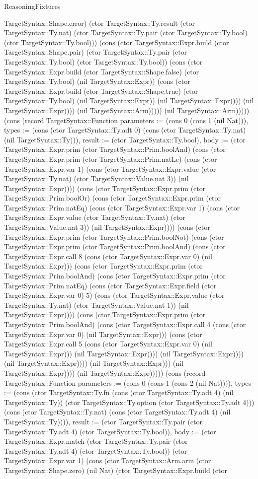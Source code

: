 \begin{lexlean}{ReasoningFixtures}
\begin{semanticmodule}
{TargetSyntax::Shape.error) (ctor TargetSyntax::Ty.result (ctor TargetSyntax::Ty.nat) (ctor TargetSyntax::Ty.pair (ctor TargetSyntax::Ty.bool) (ctor TargetSyntax::Ty.bool))) (cons (ctor TargetSyntax::Expr.build (ctor TargetSyntax::Shape.pair) (ctor TargetSyntax::Ty.pair (ctor TargetSyntax::Ty.bool) (ctor TargetSyntax::Ty.bool)) (cons (ctor TargetSyntax::Expr.build (ctor TargetSyntax::Shape.false) (ctor TargetSyntax::Ty.bool) (nil TargetSyntax::Expr)) (cons (ctor TargetSyntax::Expr.build (ctor TargetSyntax::Shape.true) (ctor TargetSyntax::Ty.bool) (nil TargetSyntax::Expr)) (nil TargetSyntax::Expr)))) (nil TargetSyntax::Expr)))) (nil TargetSyntax::Arm))))) (nil TargetSyntax::Arm))))}) (cons (record TargetSyntax::Function {parameters := (cons 0 (cons 1 (nil Nat))), types := (cons (ctor TargetSyntax::Ty.adt 0) (cons (ctor TargetSyntax::Ty.nat) (nil TargetSyntax::Ty))), result := (ctor TargetSyntax::Ty.bool), body := (ctor TargetSyntax::Expr.prim (ctor TargetSyntax::Prim.boolAnd) (cons (ctor TargetSyntax::Expr.prim (ctor TargetSyntax::Prim.natLe) (cons (ctor TargetSyntax::Expr.var 1) (cons (ctor TargetSyntax::Expr.value (ctor TargetSyntax::Ty.nat) (ctor TargetSyntax::Value.nat 3)) (nil TargetSyntax::Expr)))) (cons (ctor TargetSyntax::Expr.prim (ctor TargetSyntax::Prim.boolOr) (cons (ctor TargetSyntax::Expr.prim (ctor TargetSyntax::Prim.natEq) (cons (ctor TargetSyntax::Expr.var 1) (cons (ctor TargetSyntax::Expr.value (ctor TargetSyntax::Ty.nat) (ctor TargetSyntax::Value.nat 3)) (nil TargetSyntax::Expr)))) (cons (ctor TargetSyntax::Expr.prim (ctor TargetSyntax::Prim.boolNot) (cons (ctor TargetSyntax::Expr.prim (ctor TargetSyntax::Prim.boolAnd) (cons (ctor TargetSyntax::Expr.call 8 (cons (ctor TargetSyntax::Expr.var 0) (nil TargetSyntax::Expr))) (cons (ctor TargetSyntax::Expr.prim (ctor TargetSyntax::Prim.boolAnd) (cons (ctor TargetSyntax::Expr.prim (ctor TargetSyntax::Prim.natEq) (cons (ctor TargetSyntax::Expr.field (ctor TargetSyntax::Expr.var 0) 5) (cons (ctor TargetSyntax::Expr.value (ctor TargetSyntax::Ty.nat) (ctor TargetSyntax::Value.nat 1)) (nil TargetSyntax::Expr)))) (cons (ctor TargetSyntax::Expr.prim (ctor TargetSyntax::Prim.boolAnd) (cons (ctor TargetSyntax::Expr.call 4 (cons (ctor TargetSyntax::Expr.var 0) (nil TargetSyntax::Expr))) (cons (ctor TargetSyntax::Expr.call 5 (cons (ctor TargetSyntax::Expr.var 0) (nil TargetSyntax::Expr))) (nil TargetSyntax::Expr)))) (nil TargetSyntax::Expr)))) (nil TargetSyntax::Expr)))) (nil TargetSyntax::Expr))) (nil TargetSyntax::Expr)))) (nil TargetSyntax::Expr))))}) (cons (record TargetSyntax::Function {parameters := (cons 0 (cons 1 (cons 2 (nil Nat)))), types := (cons (ctor TargetSyntax::Ty.fn (cons (ctor TargetSyntax::Ty.adt 4) (nil TargetSyntax::Ty)) (ctor TargetSyntax::Ty.option (ctor TargetSyntax::Ty.adt 4))) (cons (ctor TargetSyntax::Ty.nat) (cons (ctor TargetSyntax::Ty.adt 4) (nil TargetSyntax::Ty)))), result := (ctor TargetSyntax::Ty.pair (ctor TargetSyntax::Ty.adt 4) (ctor TargetSyntax::Ty.bool)), body := (ctor TargetSyntax::Expr.match (ctor TargetSyntax::Ty.pair (ctor TargetSyntax::Ty.adt 4) (ctor TargetSyntax::Ty.bool)) (ctor TargetSyntax::Expr.var 1) (cons (ctor TargetSyntax::Arm.arm (ctor TargetSyntax::Shape.zero) (nil Nat) (ctor TargetSyntax::Expr.build (ctor }
\end{semanticmodule}
\end{lexlean}
